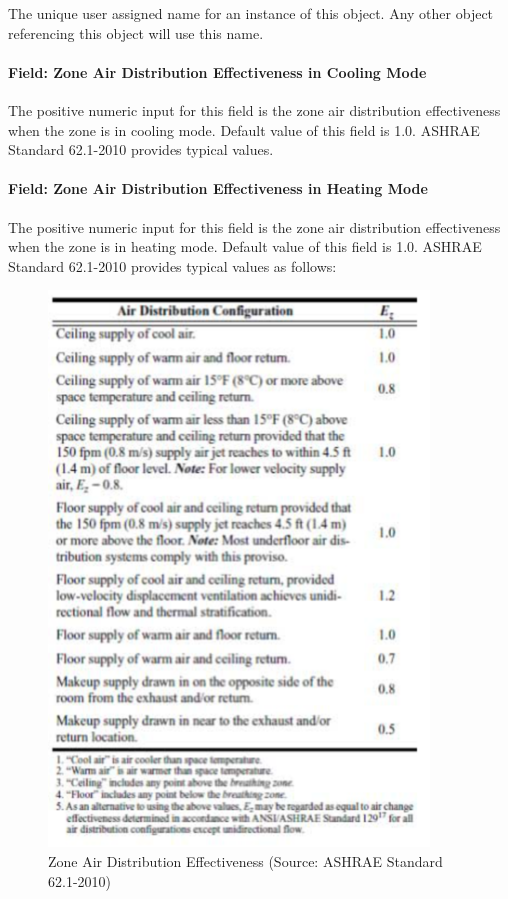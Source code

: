 The unique user assigned name for an instance of this object. Any other object referencing this object will use this name.

\paragraph{Field: Zone Air Distribution Effectiveness in Cooling Mode}\label{field-zone-air-distribution-effectiveness-in-cooling-mode}

The positive numeric input for this field is the zone air distribution effectiveness when the zone is in cooling mode. Default value of this field is 1.0. ASHRAE Standard 62.1-2010 provides typical values.

\paragraph{Field: Zone Air Distribution Effectiveness in Heating Mode}\label{field-zone-air-distribution-effectiveness-in-heating-mode}

The positive numeric input for this field is the zone air distribution effectiveness when the zone is in heating mode. Default value of this field is 1.0. ASHRAE Standard 62.1-2010 provides typical values as follows:

\begin{figure}[hbtp] %
\centering
\includegraphics[width=0.9\textwidth, height=0.9\textheight, keepaspectratio=true]{media/image133.png}
\caption{Zone Air Distribution Effectiveness (Source: ASHRAE Standard 62.1-2010) \protect \label{fig:zone-air-distribution-effectiveness-source}}
\end{figure}

